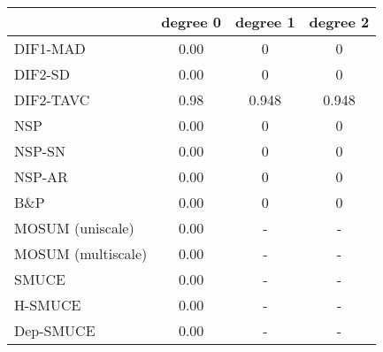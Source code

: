 \begin{tabular}{|l|c|c|c|}
  \hline
 & degree 0 & degree 1 & degree 2 \\ 
  \hline
DIF1-MAD & 0.00 & 0 & 0 \\ 
  DIF2-SD & 0.00 & 0 & 0 \\ 
  DIF2-TAVC & 0.98 & 0.948 & 0.948 \\ 
  NSP & 0.00 & 0 & 0 \\ 
  NSP-SN & 0.00 & 0 & 0 \\ 
  NSP-AR & 0.00 & 0 & 0 \\ 
  B\&P & 0.00 & 0 & 0 \\ 
  MOSUM (uniscale) & 0.00 & - & - \\ 
  MOSUM (multiscale) & 0.00 & - & - \\ 
  SMUCE & 0.00 & - & - \\ 
  H-SMUCE & 0.00 & - & - \\ 
  Dep-SMUCE & 0.00 & - & - \\ 
   \hline
\end{tabular}
